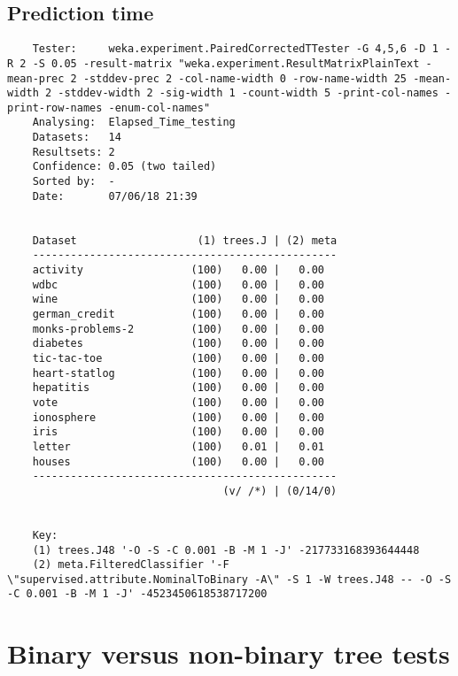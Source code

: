 \subsection{Prediction time}
\begin{verbatim}
    Tester:     weka.experiment.PairedCorrectedTTester -G 4,5,6 -D 1 -R 2 -S 0.05 -result-matrix "weka.experiment.ResultMatrixPlainText -mean-prec 2 -stddev-prec 2 -col-name-width 0 -row-name-width 25 -mean-width 2 -stddev-width 2 -sig-width 1 -count-width 5 -print-col-names -print-row-names -enum-col-names"
    Analysing:  Elapsed_Time_testing
    Datasets:   14
    Resultsets: 2
    Confidence: 0.05 (two tailed)
    Sorted by:  -
    Date:       07/06/18 21:39
    
    
    Dataset                   (1) trees.J | (2) meta
    ------------------------------------------------
    activity                 (100)   0.00 |   0.00  
    wdbc                     (100)   0.00 |   0.00  
    wine                     (100)   0.00 |   0.00  
    german_credit            (100)   0.00 |   0.00  
    monks-problems-2         (100)   0.00 |   0.00  
    diabetes                 (100)   0.00 |   0.00  
    tic-tac-toe              (100)   0.00 |   0.00  
    heart-statlog            (100)   0.00 |   0.00  
    hepatitis                (100)   0.00 |   0.00  
    vote                     (100)   0.00 |   0.00  
    ionosphere               (100)   0.00 |   0.00  
    iris                     (100)   0.00 |   0.00  
    letter                   (100)   0.01 |   0.01  
    houses                   (100)   0.00 |   0.00  
    ------------------------------------------------
                                  (v/ /*) | (0/14/0)
    
    
    Key:
    (1) trees.J48 '-O -S -C 0.001 -B -M 1 -J' -217733168393644448
    (2) meta.FilteredClassifier '-F \"supervised.attribute.NominalToBinary -A\" -S 1 -W trees.J48 -- -O -S -C 0.001 -B -M 1 -J' -4523450618538717200    
\end{verbatim}

\section{Binary versus non-binary tree tests}\label{sec:a2}
